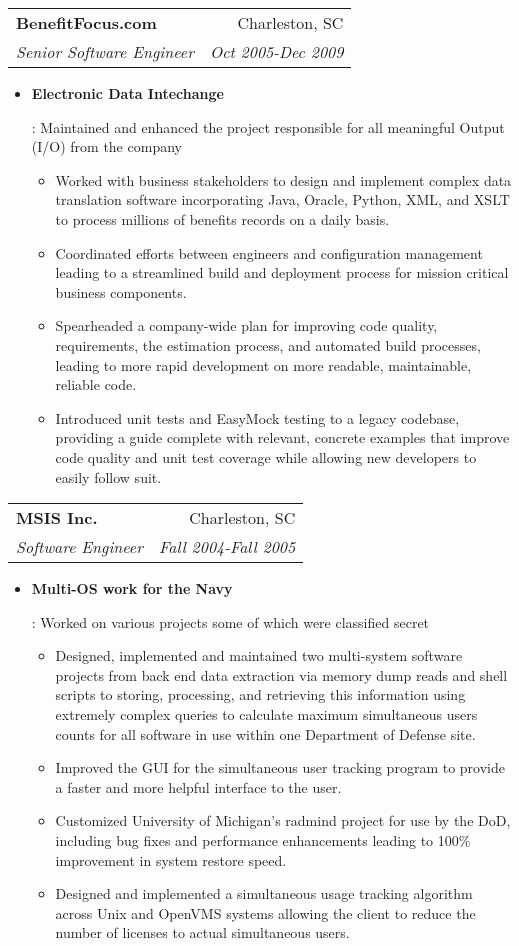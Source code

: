 \documentclass[letterpaper,10pt]{article}
\makeatletter
\newcommand{\resumeItem}[2]{
  \item\small{
    \textbf{#1}{: #2 \vspace{-2pt}}
  }
}
\newcommand{\resumeSubheading}[4]{
  \vspace{-1pt}\item[]
  \begin{tabular*}{0.98\textwidth}{l@{\extracolsep{\fill}}r}
      \hspace{-10pt}\textbf{#1} & #2 \\
      \hspace{-10pt}\textit{\small#3} & \textit{\small #4} \\
    \end{tabular*}\vspace{-5pt}
}
\newcommand{\resumeItemListStart}{\begin{itemize}}
\newcommand{\resumeItemListEnd}{\end{itemize}\vspace{-5pt}}
\makeatother
\begin{document}
    \resumeSubheading
      {BenefitFocus.com}{Charleston, SC}
      {Senior Software Engineer}{Oct 2005-Dec 2009}
      \resumeItemListStart
        \resumeItem{Electronic Data Intechange}
          {Maintained and enhanced the project responsible for all meaningful Output (I/O) from the company
            \begin{itemize}
                \item Worked with business stakeholders to design and implement complex data translation software incorporating Java, Oracle, Python, XML, and XSLT to process millions of benefits records on a daily basis.
                \item Coordinated efforts between engineers and configuration management leading to a streamlined build and deployment process for mission critical business components.
                \item Spearheaded a company-wide plan for improving code quality, requirements, the estimation process, and automated build processes, leading to more rapid development on more readable, maintainable, reliable code.
                \item  Introduced unit tests and EasyMock testing to a legacy codebase, providing a guide complete with relevant, concrete examples that improve code quality and unit test coverage while allowing new developers to easily follow suit.
            \end{itemize}}
      \resumeItemListEnd

\resumeSubheading
  {MSIS Inc.}{Charleston, SC}
  {Software Engineer}{Fall 2004-Fall 2005}
  \resumeItemListStart
    \resumeItem{Multi-OS work for the Navy}
      {Worked on various projects some of which were classified secret
        \begin{itemize}
            \item Designed, implemented and maintained two multi-system software projects from back end data extraction via memory dump reads and shell scripts to storing, processing, and retrieving this information using extremely complex queries to calculate maximum simultaneous users counts for all software in use within one Department of Defense site.
            \item Improved the GUI for the simultaneous user tracking program to provide a faster and more helpful interface to the user.
            \item Customized University of Michigan's radmind project for use by the DoD, including bug fixes and performance enhancements leading to 100\% improvement in system restore speed.
            \item Designed and implemented a simultaneous usage tracking algorithm across Unix and OpenVMS systems allowing the client to reduce the number of licenses to actual simultaneous users.
        \end{itemize}}
  \resumeItemListEnd
\end{document}
